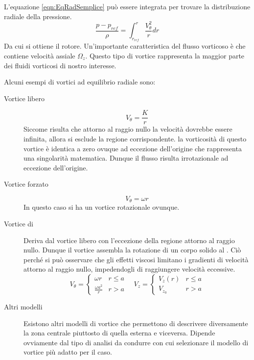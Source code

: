 L'equazione \eqref{eqn:EqRadSemplice} può essere integrata per trovare la distribuzione radiale della pressione.
\begin{equation}
\frac{p - p _{ref}}{\rho} = \int_{r_{ref}}^r{\frac{V^2_{\theta}}{r} dr}
\end{equation}
Da cui si ottiene il rotore.
Un'importante caratteristica del flusso vorticoso è che contiene velocità assiale $\Omega_z$. Questo tipo di vortice rappresenta la maggior parte dei fluidi vorticosi di nostro interesse.

Alcuni esempi di vortici ad equilibrio radiale sono:
\begin{description}
\item[Vortice libero] 
\begin{equation}
V_{\theta} = \frac{K}{r}
\label{eqn:FreeVortex}
\end{equation}
Siccome risulta che attorno al raggio nullo la velocità dovrebbe essere infinita, allora si esclude la regione corrispondente.
la vorticosità di questo vortice è identica a zero ovuque ad eccezione dell'origine che rappresenta una singolarità matematica.
Dunque il flusso risulta irrotazionale ad eccezione dell'origine.
\item[Vortice forzato]
\begin{equation}
V_{\theta} = \omega r
\end{equation}
In questo caso si ha un vortice rotazionale ovunque.
\item[Vortice di ]
Deriva dal vortice libero con l'eccezione della regione attorno al raggio nullo.
Dunque il vortice  assembla la rotazione di un corpo solido al .
Ciò perché si può osservare che gli effetti viscosi limitano i gradienti di velocità attorno al raggio nullo, impedendogli di raggiungere velocità eccessive.
\begin{equation}
V_{\theta} =%
\begin{cases}
\omega r & r \leq a\\
\frac{\omega a^2}{r} & r > a
\end{cases} \quad
V_z = %
\begin{cases}
V_z(r) & r\leq a\\
V_{z_0} & r > a
\end{cases}
\end{equation}
\item[Altri modelli] Esistono altri modelli di vortice che permettono di descrivere diversamente la zona centrale piuttosto di quella esterna e viceversa. Dipende ovviamente dal tipo di analisi da condurre con cui selezionare il modello di vortice più adatto per il caso.
\end{description}

